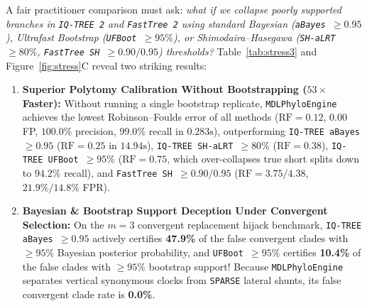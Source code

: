 \documentclass[11pt,a4paper]{article}
\begin{document}
A fair practitioner comparison must ask: \emph{what if we collapse poorly supported branches in \texttt{IQ-TREE 2} and \texttt{FastTree 2} using standard Bayesian (\texttt{aBayes $\ge 0.95$}), Ultrafast Bootstrap (\texttt{UFBoot $\ge 95\%$}), or Shimodaira--Hasegawa (\texttt{SH-aLRT $\ge 80\%$}, \texttt{FastTree SH $\ge 0.90/0.95$}) thresholds?} Table~\ref{tab:stress3} and Figure~\ref{fig:stress}C reveal two striking results:
\begin{enumerate}[leftmargin=1.8em]
    \item \textbf{Superior Polytomy Calibration Without Bootstrapping ($53\times$ Faster):} Without running a single bootstrap replicate, \texttt{MDLPhyloEngine} achieves the lowest Robinson--Foulds error of all methods ($\text{RF} = \mathbf{0.12}$, $0.00$ FP, $100.0\%$ precision, $99.0\%$ recall in $0.283\text{s}$), outperforming \texttt{IQ-TREE aBayes $\ge 0.95$} ($\text{RF} = 0.25$ in $14.94\text{s}$), \texttt{IQ-TREE SH-aLRT $\ge 80\%$} ($\text{RF} = 0.38$), \texttt{IQ-TREE UFBoot $\ge 95\%$} ($\text{RF} = 0.75$, which over-collapses true short splits down to $94.2\%$ recall), and \texttt{FastTree SH $\ge 0.90 / 0.95$} ($\text{RF} = 3.75 / 4.38$, $21.9\% / 14.8\%$ FPR).
    \item \textbf{Bayesian \& Bootstrap Support Deception Under Convergent Selection:} On the $m=3$ convergent replacement hijack benchmark, \texttt{IQ-TREE aBayes $\ge 0.95$} actively certifies \textbf{47.9\%} of the false convergent clades with $\ge 95\%$ Bayesian posterior probability, and \texttt{UFBoot $\ge 95\%$} certifies \textbf{10.4\%} of the false clades with $\ge 95\%$ bootstrap support! Because \texttt{MDLPhyloEngine} separates vertical synonymous clocks from \texttt{SPARSE} lateral shunts, its false convergent clade rate is \textbf{0.0\%}.
\end{enumerate}
\end{document}
